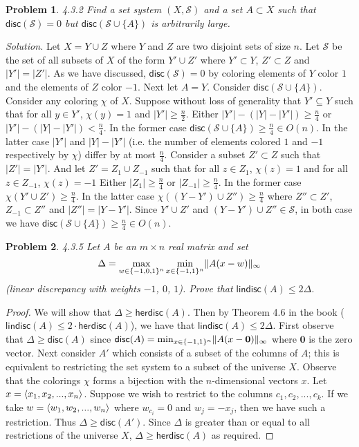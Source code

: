 \documentclass[11pt]{article}
\newcommand\disc{\mathsf{disc}}
\newcommand\SSet{\mathcal{S}}
\newcommand\lindisc{\mathsf{lindisc}}
\newcommand\herdisc{\mathsf{herdisc}}
\newtheorem{problem}{Problem}
\DeclarePairedDelimiter\anglebrac{\langle}{\rangle}
\DeclarePairedDelimiter\norm{\parallel}{\parallel}
\begin{document}
\pagebreak
\begin{problem}
4.3.2 Find a set system $(X, \SSet)$ and a set $A \subset X$ such that $\disc(\SSet) = 0$ but $\disc(\SSet \cup \{A\})$ is arbitrarily large.
\end{problem}
\emph{Solution.}
Let $X = Y \cup Z$ where $Y$ and $Z$ are two disjoint sets of size $n$. Let $\SSet$ be the set of all subsets of $X$ of the form $Y' \cup Z'$ where $Y' \subset Y$, $Z' \subset Z$ and $|Y'| = |Z'|$. As we have discussed, $\disc(\SSet) = 0$ by coloring elements of $Y$ color $1$ and the elements of $Z$ color $-1$. Next let $A = Y$. Consider $\disc(\SSet \cup \{A\})$. Consider any coloring $\chi$ of $X$. Suppose without loss of generality that $Y' \subseteq Y$ such that for all $y \in Y'$, $\chi(y) = 1$ and $|Y'| \geq \frac{n}{2}$. Either $|Y'| - (|Y| - |Y'|) \geq \frac{n}{4}$ or $|Y'| - (|Y| - |Y'|) < \frac{n}{4}$. In the former case $\disc(\SSet \cup \{A\}) \geq \frac{n}{4} \in O(n)$. In the latter case $|Y'|$ and $|Y| - |Y'|$ (i.e. the number of elements colored $1$ and $-1$ respectively by $\chi$) differ by at most $\frac{n}{4}$. Consider a subset $Z' \subset Z$ such that $|Z'| = |Y'|$. And let $Z' = Z_{1} \cup Z_{-1}$ such that for all $z \in Z_{1}$, $\chi(z) = 1$ and for all $z \in Z_{-1}$, $\chi(z) = -1$ Either $|Z_1| \geq \frac{n}{4}$ or $|Z_{-1}| \geq \frac{n}{4}$. In the former case $\chi(Y' \cup Z') \geq \frac{n}{4}$. In the latter case $\chi((Y - Y') \cup Z'') \geq \frac{n}{4}$ where $Z'' \subset Z'$, $Z_{-1} \subset Z''$ and $|Z''| = |Y - Y'|$. Since $Y' \cup Z'$ and $(Y-Y') \cup Z'' \in \SSet$, in both case we have $\disc(\SSet \cup \{A\}) \geq \frac{n}{4} \in O(n)$.


\begin{problem}
4.3.5 Let $A$ be an $m \times n$ real matrix and set
\[\Delta = \max_{w \in \{-1,0,1\}^n}\min_{x \in \{-1, 1\}^n} \norm{A(x - w)}_{\infty}\]
(\emph{linear discrepancy with weights $-1$, $0$, $1$}). Prove that $\lindisc(A) \leq 2\Delta$.
\end{problem}
\begin{proof}
We will show that $\Delta \geq \herdisc(A)$. Then by Theorem 4.6 in the book ($\lindisc(A) \leq 2\cdot \herdisc(A)$), we have that $\lindisc(A) \leq 2\Delta$. First observe that $\Delta \geq \disc(A)$ since $\disc(A) = \min_{x \in \{-1, 1\}^n} \norm{A(x - \mathbf{0})}_{\infty}$ where $\mathbf{0}$ is the zero vector. Next consider $A'$ which consists of a subset of the columns of $A$; this is equivalent to restricting the set system to a subset of the universe $X$. Observe that the colorings $\chi$ forms a bijection with the $n$-dimensional vectors $x$. Let $x = \anglebrac{x_1, x_2, ..., x_n}$. Suppose we wish to restrict to the columns $c_1, c_2,..., c_k$. If we take $w = \anglebrac{w_1, w_2, ..., w_n}$ where $w_{c_i} = 0$ and $w_j = -x_j$, then we have such a restriction. Thus $\Delta \geq \disc(A')$. Since $\Delta$ is greater than or equal to all restrictions of the universe $X$, $\Delta \geq \herdisc(A)$ as required. 
\end{proof}
\end{document}
